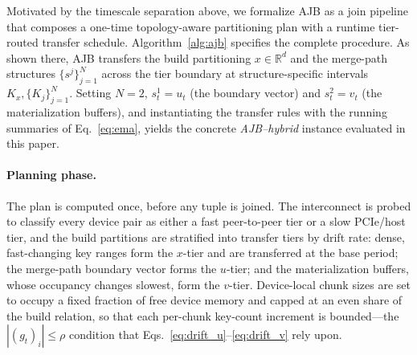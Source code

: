 \documentclass{article}
\begin{document}
Motivated by the timescale separation above, we formalize AJB as a join pipeline
that composes a one-time topology-aware partitioning plan with a runtime
tier-routed transfer schedule. Algorithm~\ref{alg:ajb} specifies the complete
procedure. As shown there, AJB transfers the build partitioning $x \in
\mathbb{R}^d$ and the merge-path structures $\{s^j\}_{j=1}^{N}$ across the tier
boundary at structure-specific intervals $K_x, \{K_j\}_{j=1}^{N}$. Setting $N =
2$, $s^1_t = u_t$ (the boundary vector) and $s^2_t = v_t$ (the materialization
buffers), and instantiating the transfer rules with the running summaries of
Eq.~\eqref{eq:ema}, yields the concrete \emph{AJB--hybrid} instance evaluated in
this paper.

\paragraph{Planning phase.}
The plan is computed once, before any tuple is joined. The interconnect is
probed to classify every device pair as either a fast peer-to-peer tier or a
slow PCIe/host tier, and the build partitions are stratified into transfer tiers
by drift rate: dense, fast-changing key ranges form the $x$-tier and are
transferred at the base period; the merge-path boundary vector forms the
$u$-tier; and the materialization buffers, whose occupancy changes slowest, form
the $v$-tier. Device-local chunk sizes are set to occupy a fixed fraction of free
device memory and capped at an even share of the build relation, so that each
per-chunk key-count increment is bounded---the $|(g_t)_i| \leq \rho$ condition
that Eqs.~\eqref{eq:drift_u}--\eqref{eq:drift_v} rely upon.
\end{document}
